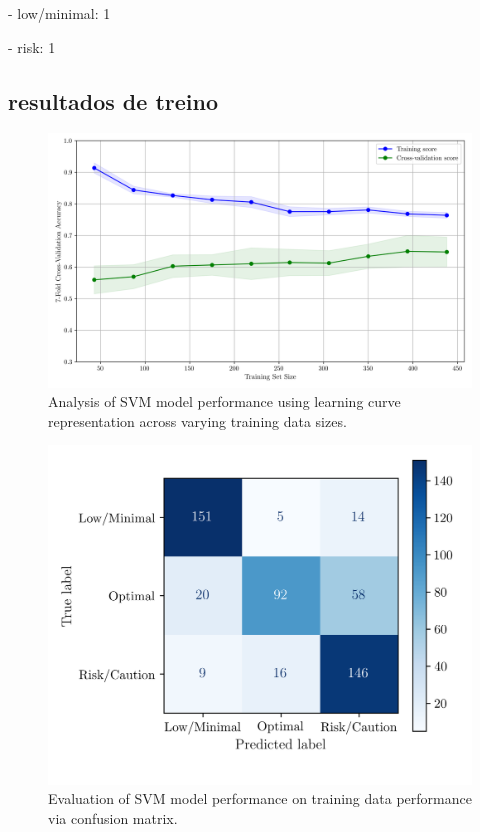 \documentclass[conference]{IEEEtran}
\begin{document}
    - low/minimal: 1

    - risk: 1


\subsection{resultados de treino}

\begin{figure}[H]
    \centering
    \includegraphics[width=1\linewidth]{assets/SVM_LearningCurve.png}
    \caption{Analysis of SVM model performance using learning curve representation across varying training data sizes.}
    \label{svm_learningcurve}
\end{figure}

\begin{figure}[H]
    \centering
    \includegraphics[width=1\linewidth]{assets/SVM_ConfusionMatrixTrain.png}
    \caption{Evaluation of SVM model performance on training data performance via confusion matrix.}
    \label{svm_cm_train}
\end{figure}
\end{document}
